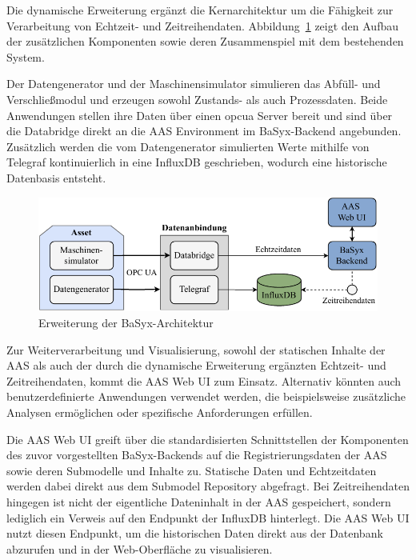 Die dynamische Erweiterung ergänzt die Kernarchitektur um die Fähigkeit zur Verarbeitung von Echtzeit- und Zeitreihendaten. 
Abbildung~\ref{fig:DynamischeErweiterungArchitektur} zeigt den Aufbau der zusätzlichen Komponenten sowie deren Zusammenspiel mit dem bestehenden System.

Der Datengenerator und der Maschinensimulator simulieren das Abfüll- und Verschließmodul und erzeugen sowohl Zustands- als auch Prozessdaten. 
Beide Anwendungen stellen ihre Daten über einen \acs{opcua} Server bereit und sind über die Databridge direkt an die AAS Environment im BaSyx-Backend angebunden.
Zusätzlich werden die vom Datengenerator simulierten Werte mithilfe von Telegraf kontinuierlich in eine InfluxDB geschrieben, wodurch eine historische Datenbasis entsteht. 


\newpage
\begin{figure}[htbp]
    \centering
        \includegraphics[width=1\textwidth]{Bilder/Ergebnisse/Systemarchitektur/DynamischeErwweiterungNeu.pdf}
    \caption{Erweiterung der BaSyx-Architektur}
    \label{fig:DynamischeErweiterungArchitektur}
\end{figure}

Zur Weiterverarbeitung und Visualisierung, sowohl der statischen Inhalte der AAS als auch der durch die dynamische Erweiterung ergänzten Echtzeit- und Zeitreihendaten, kommt die AAS Web UI zum Einsatz. 
Alternativ könnten auch benutzerdefinierte Anwendungen verwendet werden, die beispielsweise zusätzliche Analysen ermöglichen oder spezifische Anforderungen erfüllen.

Die AAS Web UI greift über die standardisierten Schnittstellen der Komponenten des zuvor vorgestellten BaSyx-Backends auf die Registrierungsdaten der AAS sowie deren Submodelle und Inhalte zu. 
Statische Daten und Echtzeitdaten werden dabei direkt aus dem Submodel Repository abgefragt. 
Bei Zeitreihendaten hingegen ist nicht der eigentliche Dateninhalt in der AAS gespeichert, sondern lediglich ein Verweis auf den Endpunkt der InfluxDB hinterlegt. 
Die AAS Web UI nutzt diesen Endpunkt, um die historischen Daten direkt aus der Datenbank abzurufen und in der Web-Oberfläche zu visualisieren.

